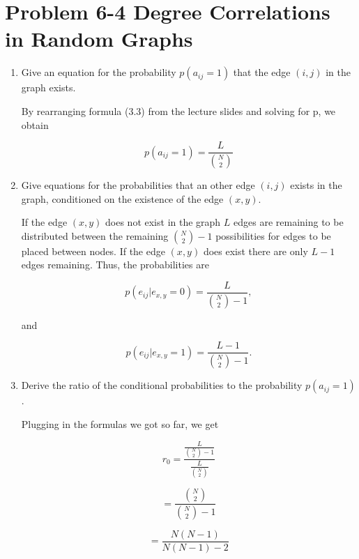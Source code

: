 \section{Problem 6-4 Degree Correlations in Random Graphs}

\begin{enumerate}
	\item Give an equation for the probability $p(a_{ij} = 1)$ that the edge $(i,j)$ in the graph exists.
	
	By rearranging formula (3.3) from the lecture slides and solving for p, we obtain
	
	\begin{equation}
	p(a_{ij} = 1) = \frac{L}{\binom{N}{2}}
	\end{equation}
	
	\item Give equations for the probabilities that an other edge $(i,j)$ exists in the graph, conditioned on the existence of the edge $(x,y)$.
	
	If the edge $(x,y)$ does not exist in the graph $L$ edges are remaining to be distributed between the remaining $\binom{N}{2} - 1$ possibilities for edges to be placed between nodes.  If the edge $(x,y)$ does exist there are only $L-1$ edges remaining. Thus, the probabilities are
	
	\begin{equation}
	p(e_{ij}|e_{x,y}=0) = \frac{L}{\binom{N}{2} - 1},
	\end{equation}
	
	and
	
	\begin{equation}
	p(e_{ij}|e_{x,y}=1) = \frac{L - 1}{\binom{N}{2} - 1}.
	\end{equation}
	
	\item Derive the ratio of the conditional probabilities to the probability $p(a_{ij} = 1)$.
	
	Plugging in the formulas we got so far,  we get
	
	\begin{equation}
	r_0 =\frac{
					 \frac{L}{\binom{N}{2} - 1}
					 }
					 {
					 \frac{L}{\binom{N}{2}}
					 }
	\end{equation}
	
	\begin{equation}
	= \frac{\binom{N}{2}}{\binom{N}{2} - 1}
	\end{equation}
	
	\begin{equation}
	= \frac{N(N - 1)}{N(N - 1) - 2}
	\end{equation}
	

\end{enumerate}

